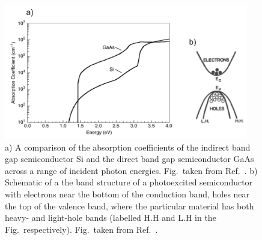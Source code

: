 \documentclass[11pt, twoside]{report}
\begin{document}
\begin{figure}[h!]
  \centering
    \includegraphics[width=0.95\textwidth]{figures/ab+m_eff.png}
    \caption[a) A comparison of the absorption coefficients of the indirect band gap semiconductor Si and the direct band gap semiconductor GaAs across a range of incident photon energies. b) Schematic of a the band structure of a photoexcited semiconductor with electrons near the bottom of the conduction band, holes near the top of the valence band, where the particular material has both heavy- and light-hole bands (labelled H.H and L.H in the Fig.~respectively).]{a) A comparison of the absorption coefficients of the indirect band gap semiconductor Si and the direct band gap semiconductor GaAs across a range of incident photon energies. Fig.~taken from Ref.~. b) Schematic of a the band structure of a photoexcited semiconductor with electrons near the bottom of the conduction band, holes near the top of the valence band, where the particular material has both heavy- and light-hole bands (labelled H.H and L.H in the Fig.~respectively). Fig.~taken from Ref.~.}
  \label{ab+m_eff}
\end{figure}
\end{document}
